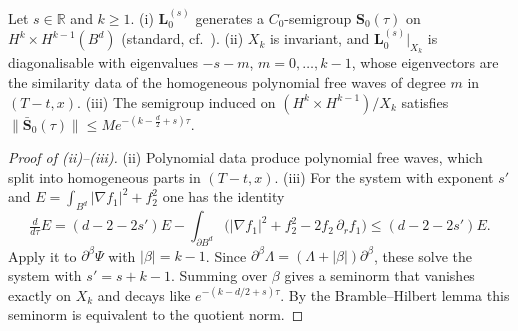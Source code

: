 \begin{lemma}\label{acou:lem-free}
Let $s\in\mathbb R$ and $k\ge1$. (i) $\mathbf L_0^{(s)}$ generates a
$C_0$-semigroup $\mathbf S_0(\tau)$ on $H^k\times H^{k-1}(B^d)$ (standard,
cf.\ \cite{DonningerSchoerkhuber2017,Glogic2022,Ostermann2024}). (ii) $X_k$
is invariant, and $\mathbf L_0^{(s)}|_{X_k}$ is diagonalisable with eigenvalues
$-s-m$, $m=0,\dots,k-1$, whose eigenvectors are the similarity data of the
homogeneous polynomial free waves of degree $m$ in $(T-t,x)$. (iii) The
semigroup induced on $(H^k\times H^{k-1})/X_k$ satisfies
$\|\bar{\mathbf S}_0(\tau)\|\le Me^{-(k-\frac d2+s)\tau}$.
\end{lemma}
\begin{proof}[Proof of (ii)--(iii)]
(ii) Polynomial data produce polynomial free waves, which split into
homogeneous parts in $(T-t,x)$. (iii) For the system with exponent $s'$ and
$E=\int_{B^d}|\nabla f_1|^2+f_2^2$ one has the identity
\[
  \tfrac{d}{d\tau}E=(d-2-2s')E-\int_{\partial B^d}\big(|\nabla f_1|^2+f_2^2-2f_2\,\partial_rf_1\big)
  \le(d-2-2s')E .
\]
Apply it to $\partial^\beta\Psi$ with $|\beta|=k-1$. Since
$\partial^\beta\Lambda=(\Lambda+|\beta|)\partial^\beta$, these solve the system
with $s'=s+k-1$. Summing over $\beta$ gives a seminorm that vanishes exactly
on $X_k$ and decays like $e^{-(k-d/2+s)\tau}$. By the Bramble--Hilbert
lemma this seminorm is equivalent to the quotient norm.
\end{proof}

